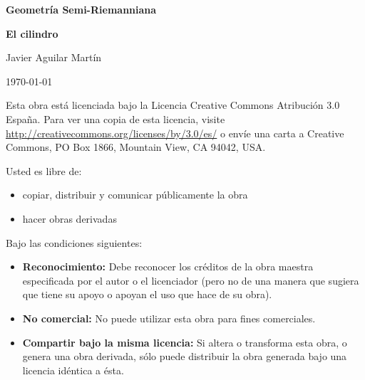 \documentclass[twoside, 11pt]{article}
\theoremstyle{definition}
\begin{document}
\begin{titlepage}
	\centering
	{\huge\bfseries Geometría Semi-Riemanniana \par}
	\vspace{1cm}
	{\Huge\bfseries El cilindro \par}
	\vspace{1cm}
	{\Large Javier Aguilar Martín\par}
	\vspace{1cm}
	{\large \today\par}
	\vspace{1cm}

\begin{abstract}
\normalsize
Este trabajo consiste en desarrollar un ejemplo en el que se repasan los principales conceptos sobre Variedades Diferenciables y Geometría Riemanniana, concretamente el cilindro. 
\end{abstract}

	\vfill
	{\small Esta obra está licenciada bajo la Licencia Creative Commons Atribución 3.0 España. Para ver una copia de esta licencia, visite \url{http://creativecommons.org/licenses/by/3.0/es/} o envíe una carta a Creative Commons, PO Box 1866, Mountain View, CA 94042, USA.

\bigskip

Usted es libre de:
\begin{itemize}
 \item copiar, distribuir y comunicar públicamente la obra
\item hacer obras derivadas
\end{itemize}

Bajo las condiciones siguientes:
\begin{itemize}
 \item {\bf Reconocimiento:} Debe reconocer los créditos de la obra maestra especificada por el autor o el licenciador (pero no de una manera que sugiera que tiene su apoyo o apoyan el uso que hace de su obra).
 \item {\bf No comercial:} No puede utilizar esta obra para fines comerciales.
\item {\bf Compartir bajo la misma licencia:} Si altera o transforma esta obra, o genera una obra derivada, sólo puede distribuir la obra generada bajo una licencia idéntica a ésta.
\end{itemize}}

	
\end{titlepage}

\tableofcontents
\end{document}
